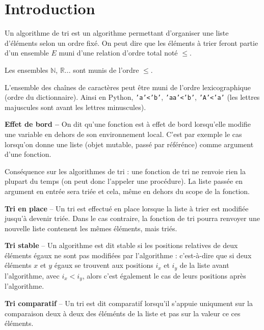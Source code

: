 \section{Introduction}
Un algorithme de tri est un algorithme permettant d'organiser une liste d'éléments selon un ordre fixé.  On peut dire que les éléments à trier feront partie d'un ensemble $E$ muni d'une relation d'ordre total noté $\leq$.
\begin{exemple}
Les ensembles $\mathbb{N}$, $\mathbb{R}$... sont munis de l'ordre $\leq$. 

L'ensemble des chaînes de caractères peut être muni de l'ordre lexicographique (ordre du dictionnaire). Ainsi en Python, \texttt{'a'<'b'}, \texttt{'aa'<'b'}, \texttt{'A'<'a'} (les lettres majuscules sont avant les lettres minuscules).
\end{exemple}

\begin{defi}\textbf{Effet de bord -- } On dit qu'une fonction est à effet de bord lorsqu'elle modifie une variable  en dehors de son environnement local. C'est par exemple le cas lorsqu'on donne une liste (objet mutable, passé par référénce) comme argument d'une fonction.

Conséquence sur les algorithmes de tri : une fonction de tri ne renvoie rien la plupart du temps (on peut donc l'appeler une procédure). La liste passée en argument en entrée sera triée et cela, même en dehors du scope de la fonction. 
\end{defi}


\begin{defi}\textbf{Tri en place} -- 
Un tri est effectué en place lorsque la liste à trier est modifiée jusqu'à devenir triée. Dans le cas contraire, la fonction de tri pourra renvoyer une nouvelle liste contenent les mêmes éléments, mais triés. 
\end{defi}


\begin{defi}\textbf{Tri stable} -- 
Un algorithme est dit stable si les positions relatives de deux éléments égaux ne sont pas
modifiées par l’algorithme : c’est-à-dire que si deux éléments $x$ et $y$ égaux se trouvent aux positions $i_x$ et $i_y$ de
la liste avant l’algorithme, avec $i_x < i_y$, alors c’est également le cas de leurs positions après l’algorithme.
\end{defi}

\begin{defi}\textbf{Tri comparatif} --
Un tri est dit comparatif lorsqu'il s'appuie uniqument sur la comparaison deux à deux des éléménts de la liste et pas sur la valeur ce ces éléments.
\end{defi}

